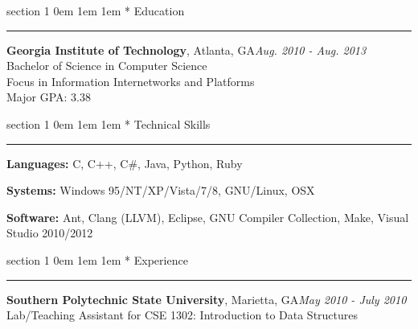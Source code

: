 \documentclass{article}
\makeatletter
\newcommand{\name}[1]{\def \@name {#1}}
\newcommand{\streetaddress}[1]{\def \@streetaddress {#1}}
\newcommand{\citystatezip}[1]{\def \@citystatezip {#1}}
\newcommand{\phone}[1]{\def \@phone {#1}}
\newcommand{\email}[1]{\def \@email {#1}}
\newcommand{\website}[1]{\def \@website {#1}}
\renewcommand{\section}[1]{
	\vspace{0.75em} %
	\@startsection
		{section}
		{1}
		{\z@}
		{0em}
		{1em \@minus 1em} %
		{\normalfont\large\sc\bfseries}
		*
		{#1}
	\vspace{-0.75em} %
	\hrule
	\vspace{0.25em} %
	\par
}
\newcommand{\entry}[1]{\def \@entry {#1}}
\newcommand{\dates}[1]{\def \@dates {#1}}
\newcommand{\location}[1]{\def \@location {#1}}
\newenvironment{locationentry}{
		\vspace{0.5em} %
		{\bf \@entry}, \@location \hfill {\it \@dates} \\
	}{}
\makeatother
\begin{document}
\name{Robert Kernan}
\phone{(770) 355-4050}
\streetaddress{16 Arbor Way Drive}
\citystatezip{Decatur, GA 30030}
\email{rkernan@gmail.com}
\website{robertkernan.com}

\maketitle

\thispagestyle{empty}

%
%

\section{Education}
\entry{Georgia Institute of Technology}
\location{Atlanta, GA}
\dates{Aug. 2010 - Aug. 2013}
\begin{locationentry}
Bachelor of Science in Computer Science \\
Focus in Information Internetworks and Platforms \\
Major GPA: 3.38 \\
\par
\end{locationentry}

\section{Technical Skills}
\vspace{0.5em}
{\bf Languages:}
C, C++, C\#, Java, Python, Ruby

\vspace{0.25em}
{\bf Systems:}
Windows 95/NT/XP/Vista/7/8, GNU/Linux, OSX

\vspace{0.25em}
{\bf Software:}
Ant, Clang (LLVM), Eclipse, GNU Compiler Collection, Make, Visual Studio 2010/2012

\section{Experience}
\entry{Southern Polytechnic State University}
\location{Marietta, GA}
\dates{May 2010 - July 2010}
\begin{locationentry}
 Lab/Teaching Assistant for CSE 1302: Introduction to Data Structures
\end{locationentry}
\end{document}

